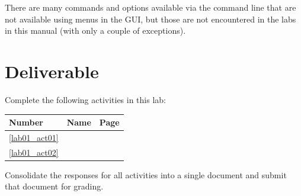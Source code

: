 There are many commands and options available via the command line that are not available using menus in the \ac{GUI}, but those are not encountered in the labs in this manual (with only a couple of exceptions).

\section{Deliverable}

Complete the following activities in this lab:

\begin{center}
  \begin{tabular}{lll}
    \hline 
    \textbf{Number} & \textbf{Name} & \textbf{Page} \\ 
    \hline 
    \ref{lab01_act01} & \nameref{lab01_act01} & \pageref{lab01_act01} \\ 
    \ref{lab01_act02} & \nameref{lab01_act02} & \pageref{lab01_act02} \\ 
    \hline 
  \end{tabular} 
\end{center}

Consolidate the responses for all activities into a single document and submit that document for grading.



